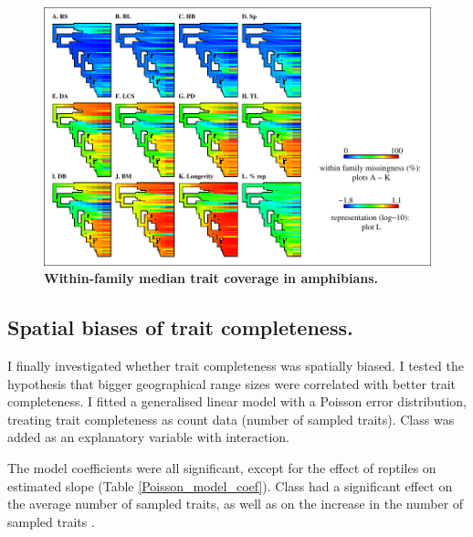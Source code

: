 \begin{figure}[h!]
\centering
\includegraphics[scale=1]{figures/chapter2/NA_phylo_patterns/Amphibians_coverage}
\caption[Within-family median trait coverage in amphibians]{\textbf{Within-family median trait coverage in amphibians.}}
\label{familycov_amphibians}
\end{figure}

\pagebreak


\subsection{Spatial biases of trait completeness.} 
I finally investigated whether trait completeness was spatially biased. I tested the hypothesis that bigger geographical range sizes were correlated with better trait completeness. I fitted a generalised linear model with a Poisson error distribution, treating trait completeness as count data (number of sampled traits). Class was added as an explanatory variable with interaction. 

The model coefficients were all significant, except for the effect of reptiles on estimated slope (Table \ref{Poisson_model_coef}). Class had a significant effect on the average number of sampled traits, as well as on the increase in the number of sampled traits . 

\renewcommand{\baselinestretch}{1}
\renewcommand{\arraystretch}{1.5}
\begin{center}\fontsize{9}{11}\selectfont
{}
\label{Poisson_model_coef}
\end{center}



